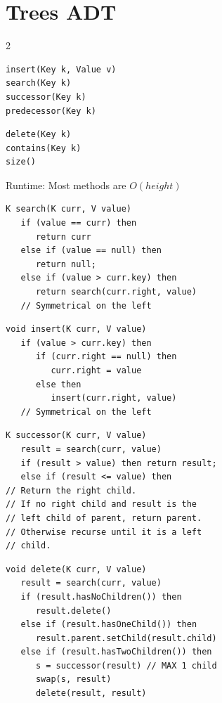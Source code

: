 \section{Trees ADT}
\begin{multicols*}{2}
\begin{verbatim}
insert(Key k, Value v)
search(Key k)
successor(Key k)
predecessor(Key k)
\end{verbatim}
\begin{verbatim}
delete(Key k)
contains(Key k)
size()
\end{verbatim}
\end{multicols*}
\textcolor{Bittersweet}{Runtime}: Most methods are $O(height)$
\begin{verbatim}
K search(K curr, V value)
   if (value == curr) then
      return curr
   else if (value == null) then
      return null;
   else if (value > curr.key) then
      return search(curr.right, value)
   // Symmetrical on the left
\end{verbatim}
\begin{verbatim}
void insert(K curr, V value)
   if (value > curr.key) then
      if (curr.right == null) then
         curr.right = value
      else then
         insert(curr.right, value)
   // Symmetrical on the left
\end{verbatim}
\begin{verbatim}
K successor(K curr, V value)
   result = search(curr, value)
   if (result > value) then return result;
   else if (result <= value) then
// Return the right child.
// If no right child and result is the 
// left child of parent, return parent.
// Otherwise recurse until it is a left
// child.
\end{verbatim}
\begin{verbatim}
void delete(K curr, V value)
   result = search(curr, value)
   if (result.hasNoChildren()) then
      result.delete()
   else if (result.hasOneChild()) then
      result.parent.setChild(result.child)
   else if (result.hasTwoChildren()) then
      s = successor(result) // MAX 1 child
      swap(s, result)
      delete(result, result)
\end{verbatim}
